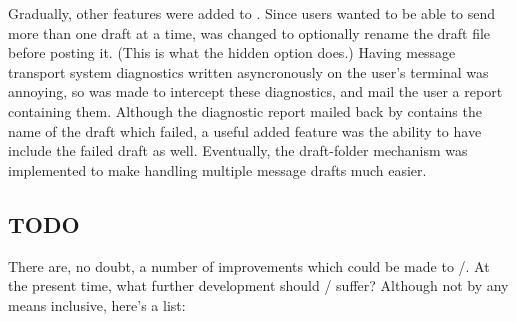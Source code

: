 Gradually, other features were added to .
Since users wanted to be able to send more than one draft
at a time,  was changed to optionally
rename the draft file before posting it.
(This is what the hidden  option does.)
Having message transport system diagnostics
written asyncronously on the user's terminal was annoying,
so  was made to intercept these diagnostics,
and mail the user a report containing them.
Although the diagnostic report mailed back by  contains
the name of the draft which failed,
a useful added feature was the ability to have 
include the failed draft as well.
Eventually, the draft-folder mechanism was implemented to make
handling multiple message drafts much easier.


\subsection{TODO}				%
There are, no doubt, a number of improvements which could be made to \MH/.
At the present time,
what further development should \MH/ suffer?
Although not by any means inclusive,
here's a list:
\smallskip
